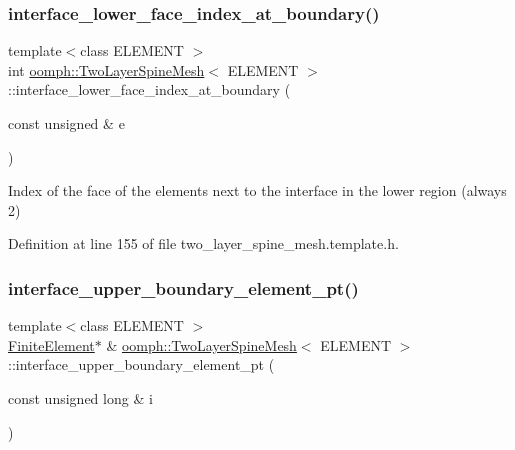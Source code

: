 \subsubsection{\texorpdfstring{interface\+\_\+lower\+\_\+face\+\_\+index\+\_\+at\+\_\+boundary()}{interface\_lower\_face\_index\_at\_boundary()}}
{\footnotesize\ttfamily template$<$class E\+L\+E\+M\+E\+NT $>$ \\
int \hyperlink{classoomph_1_1TwoLayerSpineMesh}{oomph\+::\+Two\+Layer\+Spine\+Mesh}$<$ E\+L\+E\+M\+E\+NT $>$\+::interface\+\_\+lower\+\_\+face\+\_\+index\+\_\+at\+\_\+boundary (\begin{DoxyParamCaption}\item[{const unsigned \&}]{e }\end{DoxyParamCaption})\hspace{0.3cm}{\ttfamily [inline]}}



Index of the face of the elements next to the interface in the lower region (always 2) 



Definition at line 155 of file two\+\_\+layer\+\_\+spine\+\_\+mesh.\+template.\+h.

\mbox{\label{classoomph_1_1TwoLayerSpineMesh_a35411cf1e85ed2681e8b91f42a205150}} 
\subsubsection{\texorpdfstring{interface\+\_\+upper\+\_\+boundary\+\_\+element\+\_\+pt()}{interface\_upper\_boundary\_element\_pt()}}
{\footnotesize\ttfamily template$<$class E\+L\+E\+M\+E\+NT $>$ \\
\hyperlink{classoomph_1_1FiniteElement}{Finite\+Element}$\ast$ \& \hyperlink{classoomph_1_1TwoLayerSpineMesh}{oomph\+::\+Two\+Layer\+Spine\+Mesh}$<$ E\+L\+E\+M\+E\+NT $>$\+::interface\+\_\+upper\+\_\+boundary\+\_\+element\+\_\+pt (\begin{DoxyParamCaption}\item[{const unsigned long \&}]{i }\end{DoxyParamCaption})\hspace{0.3cm}{\ttfamily [inline]}}



